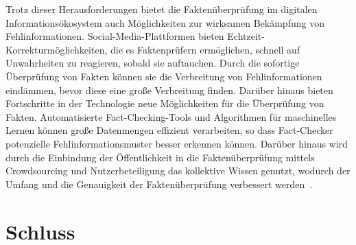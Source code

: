 \documentclass[a4paper,listof=totoc,bibliography=totoc]{scrartcl}
\begin{document}
Trotz dieser Herausforderungen bietet die Faktenüberprüfung im digitalen Informationsökosystem auch Möglichkeiten zur wirksamen Bekämpfung von Fehlinformationen. Social-Media-Plattformen 
bieten Echtzeit-Korrekturmöglichkeiten, die es Faktenprüfern ermöglichen, schnell auf Unwahrheiten zu reagieren, sobald sie auftauchen. Durch die sofortige Überprüfung von Fakten 
können sie die Verbreitung von Fehlinformationen eindämmen, bevor diese eine große Verbreitung finden. Darüber hinaus bieten Fortschritte in der Technologie neue Möglichkeiten 
für die Überprüfung von Fakten. Automatisierte Fact-Checking-Tools und Algorithmen für maschinelles Lernen können große Datenmengen effizient verarbeiten, so dass Fact-Checker 
potenzielle Fehlinformationsmuster besser erkennen können. Darüber hinaus wird durch die Einbindung der Öffentlichkeit in die Faktenüberprüfung mittels Crowdsourcing und Nutzerbeteiligung 
das kollektive Wissen genutzt, wodurch der Umfang und die Genauigkeit der Faktenüberprüfung verbessert werden~\cite{Hassan2015}.

\section{Schluss}
\end{document}
